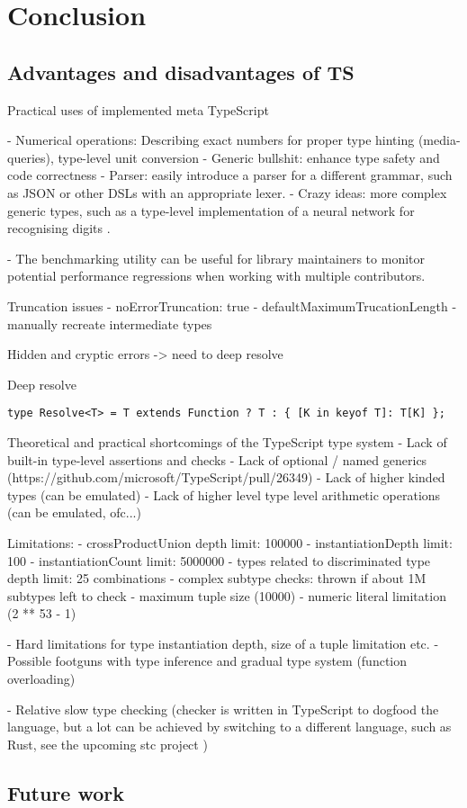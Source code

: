 \chapter{Conclusion}

\section{Advantages and disadvantages of TS}

Practical uses of implemented meta TypeScript 

- Numerical operations: Describing exact numbers for proper type hinting (media-queries), type-level unit conversion 
- Generic bullshit: enhance type safety and code correctness 
- Parser: easily introduce a parser for a different grammar, such as JSON or other DSLs with an appropriate lexer.
- Crazy ideas: more complex generic types, such as a type-level implementation of a neural network for recognising digits \cite{arshLilnasySee2023}.

- The benchmarking utility can be useful for library maintainers to monitor potential performance regressions when working with multiple contributors. 


Truncation issues
- noErrorTruncation: true
- defaultMaximumTrucationLength
- manually recreate intermediate types 

Hidden and cryptic errors -> need to deep resolve 

\begin{listing}[ht]
\caption{Deep resolve}\label{lst:deep-resolve}
\begin{verbatim}
type Resolve<T> = T extends Function ? T : { [K in keyof T]: T[K] };
\end{verbatim}
\end{listing}

Theoretical and practical shortcomings of the TypeScript type system
- Lack of built-in type-level assertions and checks 
- Lack of optional / named generics (https://github.com/microsoft/TypeScript/pull/26349)
- Lack of higher kinded types (can be emulated)
- Lack of higher level type level arithmetic operations (can be emulated, ofc...)

Limitations:
- crossProductUnion depth limit: 100000
- instantiationDepth limit: 100
- instantiationCount limit: 5000000
- types related to discriminated type depth limit: 25 combinations
- complex subtype checks: thrown if about 1M subtypes left to check
- maximum tuple size (10000)
- numeric literal limitation (2 ** 53 - 1)

- Hard limitations for type instantiation depth, size of a tuple limitation etc. 
- Possible footguns with type inference and gradual type system (function overloading)

- Relative slow type checking (checker is written in TypeScript to dogfood the language, but a lot can be achieved by switching to a different language, such as Rust, see the upcoming stc project \cite{Stc2023})

\section{Future work}
